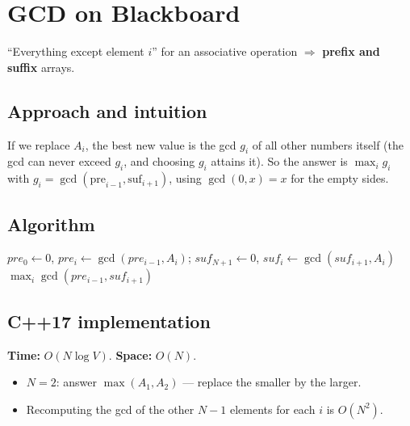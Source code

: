\section{GCD on Blackboard}
\label{sec:n-gcd-blackboard}


\begin{patternbox}
``Everything except element $i$'' for an associative operation $\Rightarrow$
\textbf{prefix and suffix} arrays.
\end{patternbox}

\subsection*{Approach and intuition}

If we replace $A_i$, the best new value is the gcd $g_i$ of all other numbers
itself (the gcd can never exceed $g_i$, and choosing $g_i$ attains it). So the
answer is $\max_i g_i$ with $g_i=\gcd(\text{pre}_{i-1},\text{suf}_{i+1})$,
using $\gcd(0,x)=x$ for the empty sides.

\subsection*{Algorithm}
\begin{algorithmic}[1]
\State $pre_0\gets0$, $pre_i\gets\gcd(pre_{i-1},A_i)$; $suf_{N+1}\gets0$, $suf_i\gets\gcd(suf_{i+1},A_i)$
\State \Return $\max_i\gcd(pre_{i-1},suf_{i+1})$
\end{algorithmic}


\subsection*{C++17 implementation}

\begin{complexitybox}
\textbf{Time:} $O(N\log V)$. \textbf{Space:} $O(N)$.
\end{complexitybox}

\begin{pitfallbox}
\begin{itemize}
  \item $N=2$: answer $\max(A_1,A_2)$ --- replace the smaller by the larger.
  \item Recomputing the gcd of the other $N-1$ elements for each $i$ is
        $O(N^2)$.
\end{itemize}
\end{pitfallbox}
